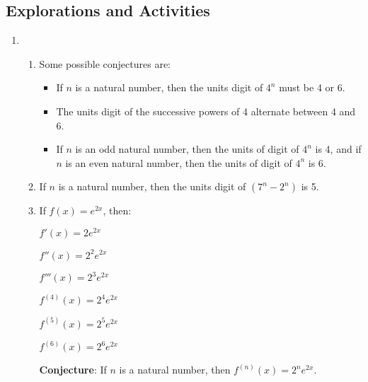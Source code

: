 \subsection*{Explorations and Activities}
\setcounter{oldenumi}{\theenumi}
\begin{enumerate} \setcounter{enumi}{\theoldenumi}
\item \begin{enumerate} 
\item Some possible conjectures are:
\begin{itemize}
\item If $n$ is a natural number, then the units digit of $4^n$ must be 4 or 6.
\item The units digit of the successive powers of 4 alternate between 4 and 6.
\item If $n$ is an odd natural number, then the units of digit of $4^n$ is 4, and if $n$ is an even natural number, then the units of digit of $4^n$ is 6.
\end{itemize}

\item If $n$ is a natural number, then the units digit of $\left( 7^n - 2^n \right)$ is 5.

\item If $f(x) = e^{2x}$, then:
\begin{multicols}{3}
$f'(x) = 2e^{2x}$

$f''(x) = 2^2 e^{2x}$

$f'''(x) = 2^3 e^{2x}$

$f^{(4)}(x) = 2^4 e^{2x}$

$f^{(5)}(x) = 2^5 e^{2x}$

$f^{(6)}(x) = 2^6 e^{2x}$
\end{multicols}

\textbf{Conjecture}:  If $n$ is a natural number, then $f^{(n)}(x) = 2^n e^{2x}$.

\end{enumerate}
\end{enumerate}

\hbreak
\endinput
